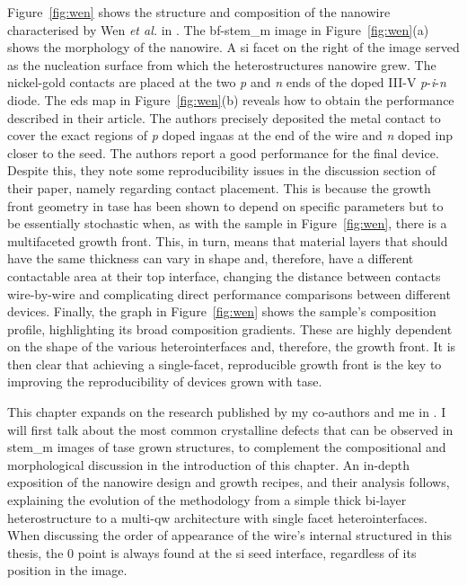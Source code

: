 Figure~\ref{fig:wen} shows the structure and composition of the nanowire characterised by Wen \textit{et al.} in \cite{Wen2022}. The \acs{bf}-\acs{stem_m} image in Figure~\ref{fig:wen}(a) shows the morphology of the nanowire. A  \acs{si} facet on the right of the image served as the nucleation surface from which the heterostructures nanowire grew. The nickel-gold contacts are placed at the two \textit{p} and \textit{n} ends of the doped III-V \textit{p}-\textit{i}-\textit{n} diode. The \acf{eds} map in Figure~\ref{fig:wen}(b) reveals how to obtain the performance described in their article. The authors precisely deposited the metal contact to cover the exact regions of \textit{p} doped \acs{ingaas} at the end of the wire and \textit{n} doped \acs{inp} closer to the seed. The authors report a good performance for the final device. Despite this, they note some reproducibility issues in the discussion section of their paper, namely regarding contact placement. This is because the growth front geometry in \acs{tase} has been shown to depend on specific parameters but to be essentially stochastic when, as with the sample in Figure~\ref{fig:wen}, there is a multifaceted growth front. This, in turn, means that material layers that should have the same thickness can vary in shape and, therefore, have a different contactable area at their top interface, changing the distance between contacts wire-by-wire and complicating direct performance comparisons between different devices. Finally, the graph in Figure~\ref{fig:wen} shows the sample's composition profile, highlighting its broad composition gradients. These are highly dependent on the shape of the various heterointerfaces and, therefore, the growth front. It is then clear that achieving a single-facet, reproducible growth front is the key to improving the reproducibility of devices grown with \acs{tase}.

This chapter expands on the research published by my co-authors and me in \cite{Brugnolotto2023}. I will first talk about the most common crystalline defects that can be observed in \acs{stem_m} images of \acs{tase} grown structures, to complement the compositional and morphological discussion in the introduction of this chapter. An in-depth exposition of the nanowire design and growth recipes, and their analysis follows, explaining the evolution of the methodology from a simple thick bi-layer heterostructure to a multi-\acl{qw} architecture with single facet heterointerfaces. When discussing the order of appearance of the wire's internal structured in this thesis, the 0 point is always found at the \acs{si} seed interface, regardless of its position in the image.

